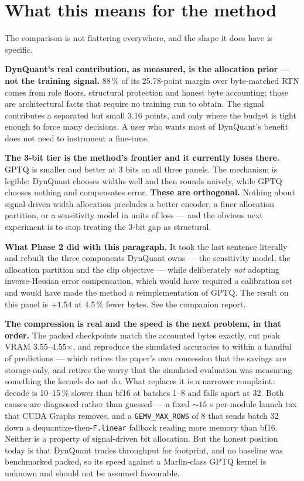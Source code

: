\documentclass[11pt]{article}
\newcommand{\x}{\texorpdfstring{$\times$}{x}}
\newcommand{\pct}{\,\%}
\newcommand{\code}[1]{\texttt{#1}}
\newenvironment{aside}%
{\par\needspace{4\baselineskip}\vspace{0.8ex}%
\begin{lrbox}{\asidebox}\begin{minipage}{\dimexpr\textwidth-18pt\relax}\small}%
{\end{minipage}\end{lrbox}%
\noindent\setlength{\fboxsep}{9pt}\colorbox{warnbg}{\usebox{\asidebox}}%
\vspace{0.6ex}\par}
\begin{document}
\section{What this means for the method}

The comparison is not flattering everywhere, and the shape it does have is specific.

\textbf{DynQuant's real contribution, as measured, is the allocation prior --- not the training
signal.} 88\pct{} of its 25.78-point margin over byte-matched RTN comes from role floors,
structural protection and honest byte accounting; those are architectural facts that require no
training run to obtain. The signal contributes a separated but small 3.16 points, and only where
the budget is tight enough to force many decisions. A user who wants most of DynQuant's benefit
does not need to instrument a fine-tune.

\textbf{The 3-bit tier is the method's frontier and it currently loses there.} GPTQ is smaller and
better at 3 bits on all three panels. The mechanism is legible: DynQuant chooses widths well and
then rounds naively, while GPTQ chooses nothing and compensates error. \textbf{These are
orthogonal.} Nothing about signal-driven width allocation precludes a better encoder, a finer
allocation partition, or a sensitivity model in units of loss --- and the obvious next experiment is
to stop treating the 3-bit gap as structural.

\begin{aside}
\textbf{What Phase 2 did with this paragraph.} It took the last sentence literally and rebuilt the
three components DynQuant owns --- the sensitivity model, the allocation partition and the clip
objective --- while deliberately \emph{not} adopting inverse-Hessian error compensation, which
would have required a calibration set and would have made the method a reimplementation of GPTQ.
The result on this panel is $+1.54$ at 4.5\pct{} fewer bytes. See the companion report.
\end{aside}

\textbf{The compression is real and the speed is the next problem, in that order.} The packed
checkpoints match the accounted bytes exactly, cut peak VRAM 3.55--4.55\x, and reproduce the
simulated accuracies to within a handful of predictions --- which retires the paper's own concession
that the savings are storage-only, and retires the worry that the simulated evaluation was measuring
something the kernels do not do. What replaces it is a narrower complaint: decode is 10--15\pct{}
slower than bf16 at batches 1--8 and falls apart at 32. Both causes are diagnosed rather than
guessed --- a fixed ${\sim}15$ \textmu s per-module launch tax that CUDA Graphs removes, and a
\code{GEMV\_MAX\_ROWS} of 8 that sends batch 32 down a dequantize-then-\code{F.linear} fallback
reading more memory than bf16. Neither is a property of signal-driven bit allocation. But the honest
position today is that DynQuant trades throughput for footprint, and no baseline was benchmarked
packed, so its speed against a Marlin-class GPTQ kernel is unknown and should not be assumed
favourable.
\end{document}
